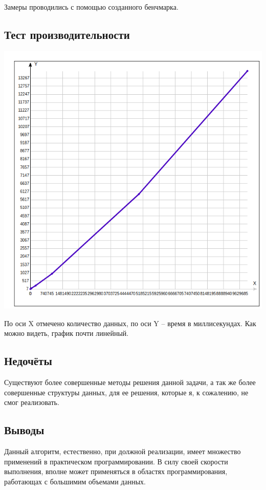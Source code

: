 \documentclass[12pt]{article}
\begin{document}

Замеры проводились с помощью созданного бенчмарка.

\subsection*{Тест производительности}
\begin{center}
    \includegraphics[scale=0.7]{graph.png}
\end{center}

По оси X отмечено количество данных, по оси Y -- время в миллисекундах. Как можно видеть, график почти линейный.

\subsection*{Недочёты}

Существуют более совершенные методы решения данной задачи, а так же более совершенные структуры данных, для ее решения, которые я, к сожалению, не смог реализовать.

\subsection*{Выводы}

Данный алгоритм, естественно, при должной реализации, имеет множество применений в практическом программировании. В силу своей скорости выполнения, вполне может применяться в областях программирования, работающах с большимим объемами данных. 
\end{document}
